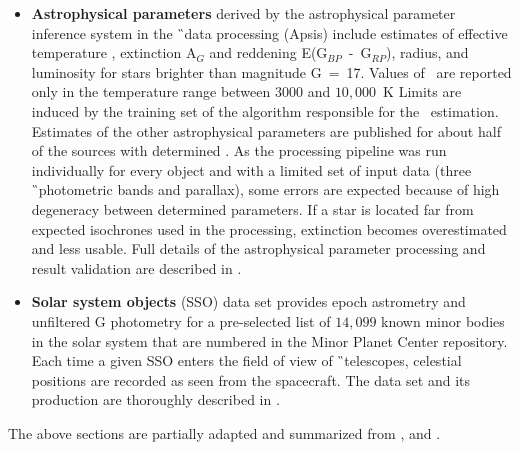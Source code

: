 \begin{itemize}
	\item \textbf{Astrophysical parameters} derived by the astrophysical parameter inference system in the \G\ data processing (Apsis) include estimates of effective temperature \Teff, extinction A$_G$ and reddening E(G$_{BP}$~-~G$_{RP}$), radius, and luminosity for stars brighter than magnitude G~=~17. Values of \Teff\ are reported only in the temperature range between $3000$ and $10,000$~K Limits are induced by the training set of the algorithm responsible for the \Teff\ estimation. Estimates of the other astrophysical parameters are published for about half of the sources with determined \Teff. As the processing pipeline was run individually for every object and with a limited set of input data (three \G\ photometric bands and parallax), some errors are expected because of high degeneracy between determined parameters. If a star is located far from expected isochrones used in the processing, extinction becomes overestimated and less usable. Full details of the astrophysical parameter processing and result validation are described in \citet{2018A&A...616A...8A}.	
	
	\item \textbf{Solar system objects} (SSO) data set provides epoch astrometry and unfiltered G photometry for a pre-selected list of $14,099$ known minor bodies in the solar system that are numbered in the Minor Planet Center repository. Each time a given SSO enters the field of view of \G\ telescopes, celestial positions are recorded as seen from the spacecraft. The data set and its production are thoroughly described in \citet{2018A&A...616A..13G}.
	
\end{itemize}

The above sections are partially adapted and summarized from \citet{2016A&A...595A...1G, 2018A&A...616A...1G}, and \citet{gaia_primer}.

